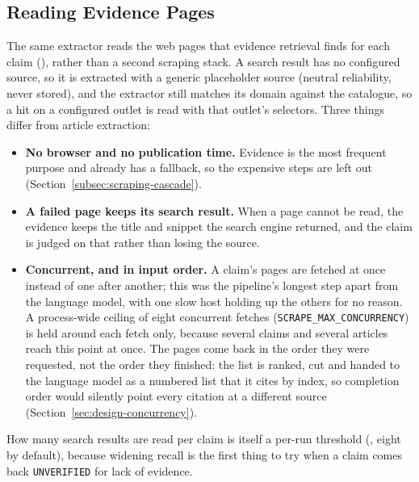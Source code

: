
\subsection{Reading Evidence Pages}
\label{subsec:scraping-evidence}

The same extractor reads the web pages that evidence retrieval finds
for each claim (),
rather than a second scraping stack. A search result has no configured
source, so it is extracted with a generic placeholder source (neutral
reliability, never stored), and the extractor still matches its domain
against the catalogue, so a hit on a configured outlet is read with
that outlet's selectors. Three things differ from article extraction:

\begin{itemize}
    \item \textbf{No browser and no publication time.} Evidence is the
    most frequent purpose and already has a fallback, so the expensive
    steps are left out (Section~\ref{subsec:scraping-cascade}).
    \item \textbf{A failed page keeps its search result.} When a page
    cannot be read, the evidence keeps the title and snippet the search
    engine returned, and the claim is judged on that rather than losing
    the source.
    \item \textbf{Concurrent, and in input order.} A claim's pages are
    fetched at once instead of one after another; this was the
    pipeline's longest step apart from the language model, with one
    slow host holding up the others for no reason. A process-wide
    ceiling of eight concurrent fetches (\texttt{SCRAPE\_MAX\_CONCURRENCY})
    is held around each fetch only, because several claims and several
    articles reach this point at once. The pages come back in the
    order they were requested, not the order they finished: the list
    is ranked, cut and handed to the language model as a numbered list
    that it cites by index, so completion order would silently point
    every citation at a different source
    (Section~\ref{sec:design-concurrency}).
\end{itemize}

How many search results are read per claim is itself a per-run
threshold (, eight by default),
because widening recall is the first thing to try when a claim comes
back \texttt{UNVERIFIED} for lack of evidence.
